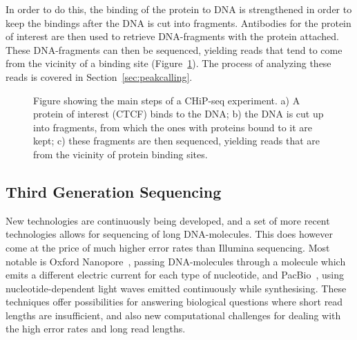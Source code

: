 In order to do this, the binding of the protein to DNA is strengthened in order to keep the bindings after the DNA is cut into fragments.
Antibodies for the protein of interest are then used to retrieve DNA-fragments with the protein attached.
These DNA-fragments can then be sequenced, yielding reads that tend to come from the vicinity of a binding site (Figure~\ref{fig:chipseq}). The process of analyzing these reads is covered in Section~\ref{sec:peakcalling}.
\begin{figure}

\caption{
  Figure showing the main steps of a CHiP-seq experiment. a) A protein of interest (CTCF) binds to the DNA; b) the DNA is cut up into fragments, from which the ones with proteins bound to it are kept; c) these fragments are then sequenced, yielding reads that are from the vicinity of protein binding sites.}
\label{fig:chipseq}
\end{figure}
\subsection{Third Generation Sequencing}
New technologies are continuously being developed, and a set of more recent technologies allows for sequencing of long DNA-molecules. This does however come at the price of much higher error rates than Illumina sequencing. Most notable is Oxford Nanopore~\cite{nanopore}, passing DNA-molecules through a molecule which emits a different electric current for each type of nucleotide, and PacBio~\cite{pacbio}, using  nucleotide-dependent light waves emitted continuously while synthesising.
These techniques offer possibilities for answering biological questions where short read lengths are insufficient, and also new computational challenges for dealing with the high error rates and long read lengths. 

